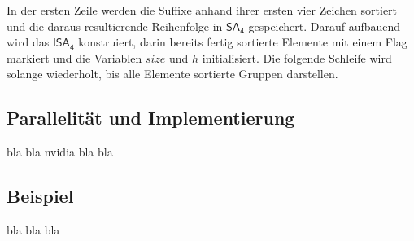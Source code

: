 In der ersten Zeile werden die Suffixe anhand ihrer ersten vier Zeichen sortiert und die daraus resultierende Reihenfolge in $\mathsf{SA_4}$ gespeichert. Darauf aufbauend wird das $\mathsf{ISA_4}$ konstruiert, darin bereits fertig sortierte Elemente mit einem Flag markiert und die Variablen $size$ und $h$ initialisiert. Die folgende Schleife wird solange wiederholt, bis alle Elemente sortierte Gruppen darstellen.  

\subsection{Parallelität und Implementierung}
bla bla nvidia bla bla
\subsection{Beispiel}
bla bla bla 